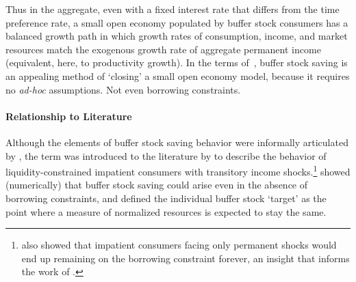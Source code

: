 \documentclass[BufferStockTheory]{subfiles}
\begin{document}
Thus in the aggregate, even with a fixed interest rate that differs from the time preference rate, a small open economy populated by buffer stock consumers has a balanced growth path in which growth rates of consumption, income, and market resources match the exogenous growth rate of aggregate permanent income (equivalent, here, to productivity growth).
In the terms of~\cite{schmitt2003closing}, buffer stock saving is an appealing method of `closing' a small open economy model, because it requires no \textit{ad-hoc} assumptions.
Not even borrowing constraints.


\vspace{-1em}

\hypertarget{cfLiterature}{}
\hypertarget{DiffFromLit}{} 
\paragraph{Relationship to Literature}


Although the elements of buffer stock saving behavior were informally articulated by \cite{friedmanATheory}, the term was introduced to the literature by \cite{deatonLiqConstr} to describe the behavior of liquidity-constrained impatient consumers with transitory income shocks.\footnote{\cite{deatonLiqConstr} also showed that impatient consumers facing only permanent shocks would end up remaining on the borrowing constraint forever, an insight that informs the work of \cite{kvwWealthyH2m}.} \cite{carroll:brookings} showed (numerically) that buffer stock saving could arise even in the absence of borrowing constraints, and defined the individual buffer stock `target' as the point where a measure of normalized resources is expected to stay the same.
\end{document}
